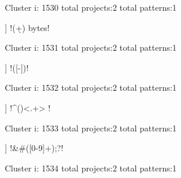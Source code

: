Cluster i: 1530
total projects:2
total patterns:1
\begin{multicols}{1}
\begin{description}[noitemsep,topsep=0pt]
\item [[2] ] \cverb!(\d+) bytes!
\end{description}
\end{multicols}







Cluster i: 1531
total projects:2
total patterns:1
\begin{multicols}{1}
\begin{description}[noitemsep,topsep=0pt]
\item [[2] ] \cverb!\s*([-\+])!
\end{description}
\end{multicols}







Cluster i: 1532
total projects:2
total patterns:1
\begin{multicols}{1}
\begin{description}[noitemsep,topsep=0pt]
\item [[2] ] \cverb!^(\s*)<.+> !
\end{description}
\end{multicols}







Cluster i: 1533
total projects:2
total patterns:1
\begin{multicols}{1}
\begin{description}[noitemsep,topsep=0pt]
\item [[2] ] \cverb!&#([0-9]+);?!
\end{description}
\end{multicols}







Cluster i: 1534
total projects:2
total patterns:1
\begin{multicols}{1}
\begin{description}[noitemsep,topsep=0pt]
\item [[2] ] \cverb!\s*\}\s*$!
\end{description}
\end{multicols}







